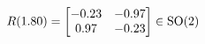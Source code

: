 \documentclass[preview]{standalone}
\begin{document}
\begin{align*}
\special{dvisvgm:raw <g id='unique000'>}R(1.80) = \begin{bmatrix} -0.23 & -0.97 \\ 0.97 & -0.23 \end{bmatrix} \in \text{SO}(2)\special{dvisvgm:raw </g>}
\end{align*}
\end{document}
